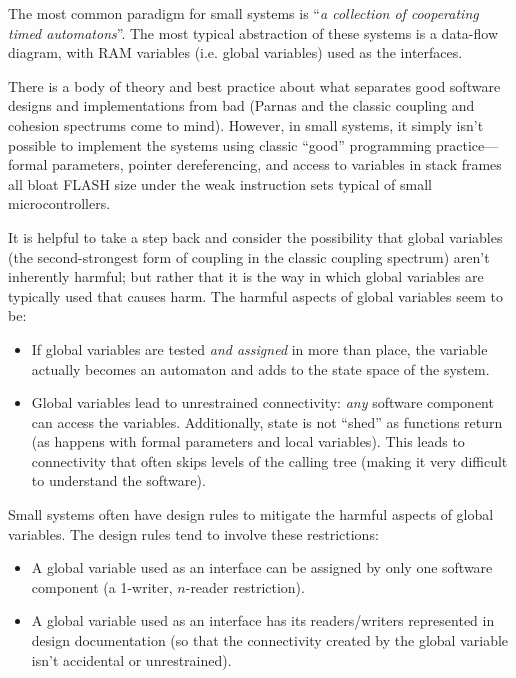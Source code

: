 \documentclass[letterpaper,10pt,titlepage]{article}
\begin{document}
The most common paradigm for small systems is ``\emph{a collection of cooperating
timed automatons}''.  The most typical abstraction of these systems is a data-flow
diagram, with RAM variables (i.e. global variables) used as the interfaces.

There is a body of theory and best practice about what separates good software designs
and implementations from bad (Parnas and the classic coupling and cohesion spectrums
come to mind).  However, in small systems, it simply isn't possible to
implement the systems using classic ``good'' programming practice---formal parameters,
pointer dereferencing, and access to variables in stack frames all bloat
FLASH size under the weak instruction sets typical of small microcontrollers.

It is helpful to take a step back and consider the possibility that global variables
(the second-strongest form of coupling in the classic coupling spectrum) aren't
inherently harmful; but rather that it is the way in which global variables are
typically used that causes harm.  The harmful aspects of global variables
seem to be:

\begin{itemize}
\item If global variables are tested \emph{and assigned} in more than place,
      the variable actually becomes an automaton and adds to the
      state space of the system.
\item Global variables lead to unrestrained connectivity:  \emph{any}
      software component can access the variables.  Additionally,
      state is not ``shed'' as functions return (as happens with formal
      parameters and local variables)\@.  This leads to connectivity
      that often skips levels of the calling tree (making it very
      difficult to understand the software).
\end{itemize}

Small systems often have design rules to mitigate the harmful aspects of
global variables.  The design rules tend to involve these restrictions:

\begin{itemize}
\item A global variable used as an interface can be assigned by only one
      software component (a 1-writer, $n$-reader restriction).
\item A global variable used as an interface has its readers/writers
      represented in design documentation (so that the connectivity
      created by the global variable isn't accidental or unrestrained).
\end{itemize}
\end{document}
